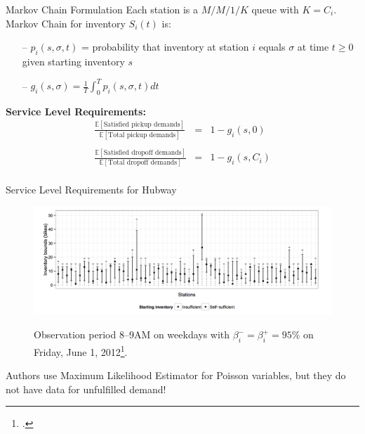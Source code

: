     \begin{frame}{Markov Chain Formulation}
    Each station is a $M/M/1/K$ queue with $K=C_i$. Markov Chain for inventory $S_i(t)$ is:
    
    \begin{itemize}
    	\pause
    	\item[--]$p_i(s, \sigma, t)$ = probability that inventory at station $i$ equals $\sigma$ at time $t \geq 0$ given starting inventory $s$ \\
    	\vspace{0.1in}
    	\pause
    	\item[--]$g_i(s, \sigma) = \frac{1}{T}\int_{0}^{T}p_i(s, \sigma, t) dt$ \\
	\end{itemize}
	\pause
	\textbf{Service Level Requirements:}
    \begin{eqnarray*}
        \frac{\mathbb{E}[\textrm{Satisfied pickup demands}]}{\mathbb{E}[\textrm{Total pickup demands}]} &=& 1 - g_i(s, 0) \\ \\
        \frac{\mathbb{E}[\textrm{Satisfied dropoff demands}]}{\mathbb{E}[\textrm{Total dropoff demands}]} &=& 1 - g_i(s, C_i) \\
    \end{eqnarray*}
    \end{frame}

    \begin{frame}{Service Level Requirements for Hubway}
        \begin{figure}
            \centering
            {\includegraphics[scale=0.17]{plots/hubway_service_level.png}}
            \caption{Observation period 8--9AM on weekdays with $\beta_i^{-}=\beta_i^{+}=95\%$ on Friday, June 1, 2012\footcite{schuijbroek2017inventory}.}
        \end{figure}
        \pause
        \alert{Authors use Maximum Likelihood Estimator for Poisson variables, but they do not have data for unfulfilled demand!}
    \end{frame}

